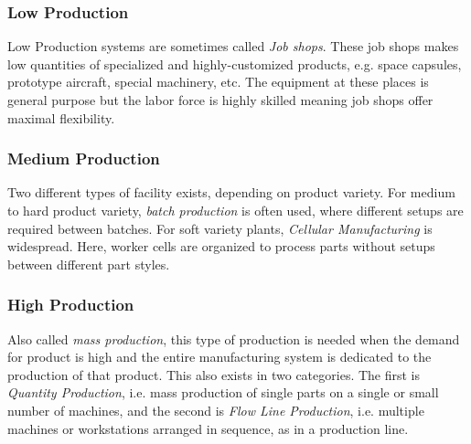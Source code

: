\subsubsection{Low Production}
Low Production systems are sometimes called \textit{Job shops}.
These job shops makes low quantities of specialized and highly-customized products, e.g. space capsules, prototype aircraft, special machinery, etc.
The equipment at these places is general purpose but the labor force is highly skilled meaning job shops offer maximal flexibility.

\subsubsection{Medium Production}
Two different types of facility exists, depending on product variety.
For medium to hard product variety, \textit{batch production} is often used, where different setups are required between batches.
For soft variety plants, \textit{Cellular Manufacturing} is widespread.
Here, worker cells are organized to process parts without setups between different part styles.

\subsubsection{High Production}
Also called \textit{mass production}, this type of production is needed when the demand for product is high and the entire manufacturing system is dedicated to the production of that product.
This also exists in two categories.
The first is \textit{Quantity Production}, i.e. mass production of single parts on a single or small number of machines, and the second is \textit{Flow Line Production}, i.e. multiple machines or workstations arranged in sequence, as in a production line.
